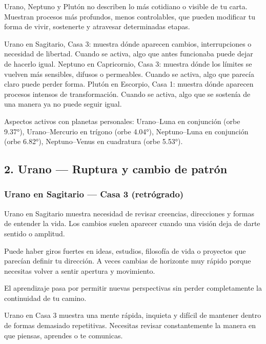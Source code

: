 \documentclass[11pt,a4paper]{article}
\begin{document}
Urano, Neptuno y Plutón no describen lo más cotidiano o visible de tu carta. Muestran procesos más profundos, menos controlables, que pueden modificar tu forma de vivir, sostenerte y atravesar determinadas etapas.

Urano en Sagitario, Casa 3: muestra dónde aparecen cambios, interrupciones o necesidad de libertad. Cuando se activa, algo que antes funcionaba puede dejar de hacerlo igual.
Neptuno en Capricornio, Casa 3: muestra dónde los límites se vuelven más sensibles, difusos o permeables. Cuando se activa, algo que parecía claro puede perder forma.
Plutón en Escorpio, Casa 1: muestra dónde aparecen procesos intensos de transformación. Cuando se activa, algo que se sostenía de una manera ya no puede seguir igual.

Aspectos activos con planetas personales: Urano–Luna en conjunción (orbe 9.37°), Urano–Mercurio en trígono (orbe 4.04°), Neptuno–Luna en conjunción (orbe 6.82°), Neptuno–Venus en cuadratura (orbe 5.53°).

\vspace{0.8cm}


\subsection{2. Urano — Ruptura y cambio de patrón}

\subsubsection*{Urano en Sagitario — Casa 3 (retrógrado)}

Urano en Sagitario muestra necesidad de revisar creencias, direcciones y formas de entender la vida. Los cambios suelen aparecer cuando una visión deja de darte sentido o amplitud.

Puede haber giros fuertes en ideas, estudios, filosofía de vida o proyectos que parecían definir tu dirección. A veces cambias de horizonte muy rápido porque necesitas volver a sentir apertura y movimiento.

El aprendizaje pasa por permitir nuevas perspectivas sin perder completamente la continuidad de tu camino.

Urano en Casa 3 muestra una mente rápida, inquieta y difícil de mantener dentro de formas demasiado repetitivas. Necesitas revisar constantemente la manera en que piensas, aprendes o te comunicas.
\end{document}
